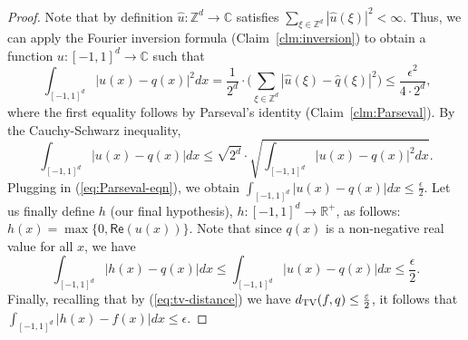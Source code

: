 \begin{proof}
Note that by definition $\widehat{u} : \mathbb{Z}^d \rightarrow \mathbb{C}$ satisfies $\sum_{\xi \in \mathbb{Z}^d} |\widehat{u}(\xi) |^2 < \infty$. Thus, we can apply the Fourier inversion formula (Claim~\ref{clm:inversion}) to obtain a function $u: [-1,1]^d \rightarrow \mathbb{C}$ such that 
\begin{equation}~\label{eq:Parseval-eqn}
\int_{[-1,1]^d} |u(x) - q(x)|^2  dx = \frac{1}{2^d} \cdot \big( \sum_{\xi \in \mathbb{Z}^d} |\widehat{u}(\xi) - \widehat{q}(\xi)|^2 \big) \le \frac{\epsilon^2}{4 \cdot 2^d},
\end{equation}
where the first equality follows by Parseval's identity (Claim~\ref{clm:Parseval}). By the Cauchy-Schwarz inequality, 
\[
\int_{[-1,1]^d} |u(x) - q(x)|  dx  \leq \sqrt{2^d} \cdot \sqrt{\int_{[-1,1]^d} |u(x) - q(x)|^2  dx }.
\]
Plugging in (\ref{eq:Parseval-eqn}), we obtain 
$
\int_{[-1,1]^d} |u(x) - q(x)|  dx \le \frac{\epsilon}{2}.$
Let us finally define $h$ (our final hypothesis), $h: [-1,1]^d \rightarrow \mathbb{R}^+$, as follows: 
$h(x) = \max \{0, \mathsf{Re}(u(x))\}$. Note that since $q(x)$ is a non-negative real value for all $x$, we have 
\begin{equation} \label{eq:pickle}
\int_{[-1,1]^d} |h(x) - q(x)|  dx \le \int_{[-1,1]^d} |u(x) - q(x)|  dx \le \frac{\epsilon}{2}. 
\end{equation}
Finally, recalling that by (\ref{eq:tv-distance}) we have $d_\mathrm{TV}(f,q) \le \frac{\varepsilon}{2}$, it follows that 
$
\int_{[-1,1]^d} |h(x) - f(x)|  dx  \le \epsilon.$


\end{proof}
